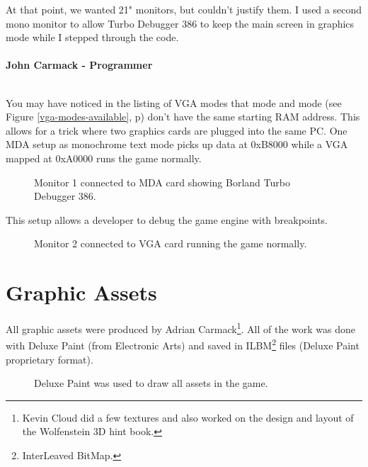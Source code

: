 \documentclass[book.tex]{subfiles}
\begin{document}
\begin{fancyquotes}
At that point, we wanted 21" monitors, but couldn't justify them.  I used a second mono monitor to allow Turbo Debugger 386 to keep the main screen in graphics mode while I stepped through the code.\\
 \\
\textbf{John Carmack - Programmer}
\end{fancyquotes}
\\
You may have noticed in the listing of VGA modes that mode  and mode  (see Figure \ref{vga-modes-available}, p\pageref{fig:vga_modes})  don't have the same starting RAM address. This allows for a trick where two graphics cards are plugged into the same PC. One MDA setup as monochrome text mode picks up data at 0xB8000 while a VGA mapped at 0xA0000 runs the game normally.
\begin{figure}[H]
  \centering
      \caption{Monitor 1 connected to MDA card showing Borland Turbo Debugger 386.}
\end{figure}
\par
 This setup allows a developer to debug the game engine with breakpoints.


\begin{figure}[H]
  \centering
    \caption{Monitor 2 connected to VGA card running the game normally.}
\end{figure}



 
 
 




\section{Graphic Assets}

All graphic assets were produced by Adrian Carmack\footnote{Kevin Cloud did a few textures and also worked on the design and layout of the Wolfenstein 3D hint book.}. All of the work was done with Deluxe Paint (from Electronic Arts) and saved in ILBM\footnote{InterLeaved BitMap.} files (Deluxe Paint proprietary format). 

\begin{figure}[H]
  \centering
 \caption{Deluxe Paint was used to draw all assets in the game.}
\end{figure}
\end{document}

